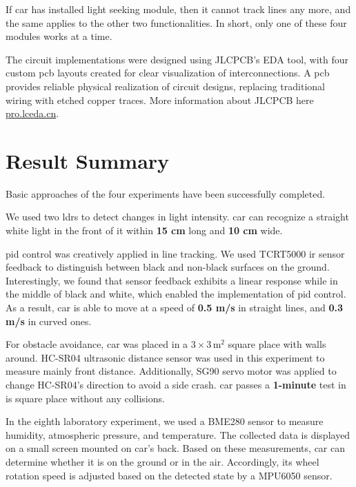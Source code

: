 \documentclass[../main]{subfiles}
\begin{document}
If \gls{car} has installed light seeking module, then it cannot track lines any more,
and the same applies to the other two functionalities.
In short, only one of these four modules works at a time.

The circuit implementations were designed using JLCPCB's EDA tool, with four custom \gls{pcb} layouts created for clear visualization of interconnections. A \gls{pcb} provides reliable physical realization of circuit designs, replacing traditional wiring with etched copper traces.
More information about JLCPCB here \href{https://pro.lceda.cn/editor}{pro.lceda.cn}.

\section{Result Summary}

Basic approaches of the four experiments have been successfully completed.

We used two \gls{ldr}s to detect changes in light intensity.
\gls{car} can recognize a straight white light in the front of it within \textbf{15 cm} long and \textbf{10 cm} wide.

\gls{pid} control was creatively applied in line tracking.
We used TCRT5000 \gls{ir} sensor feedback to distinguish between black and non-black surfaces on the ground.
Interestingly, we found that sensor feedback exhibits a linear response while in the middle of black and white,
which enabled the implementation of \gls{pid} control.
As a result, \gls{car} is able to move at a speed of
\textbf{0.5 m/s} in straight lines, and \textbf{0.3 m/s} in curved ones.

For obstacle avoidance, \gls{car} was placed in a \(3 \times 3 \, \text{m}^2\) square place with walls around.
HC-SR04 ultrasonic distance sensor was used in this experiment to measure mainly front distance.
Additionally, SG90 servo motor was applied to change HC-SR04's direction to avoid a side crash.
\gls{car} passes a \textbf{1-minute} test in is square place without any collisions.

In the eighth laboratory experiment, we used a BME280 sensor to measure
humidity, atmospheric pressure, and temperature.
The collected data is displayed on a small screen mounted on \gls{car}'s back.
Based on these measurements, \gls{car} can determine whether it is on the ground or in the air.
Accordingly, its wheel rotation speed is adjusted based on the detected state by a MPU6050 sensor.
\end{document}
